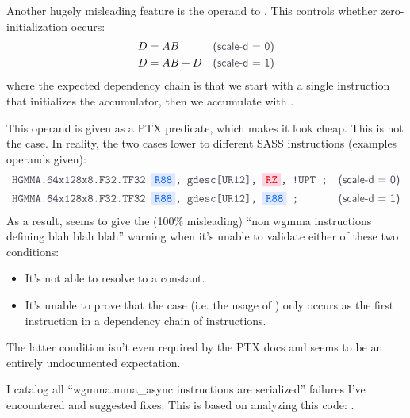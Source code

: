 \filbreak
{}

Another hugely misleading feature is the  operand to .
This controls whether zero-initialization occurs:
\begin{align*}
  & D = AB & \lightsf{(scale-d = 0)} \\
  & D = AB + D & \lightsf{(scale-d = 1)}
\end{align*}
where the expected dependency chain is that we start with a single   instruction that initializes the accumulator, then we accumulate with .

\filbreak
This  operand is given as a PTX predicate, which makes it look cheap.
This is not the case.
In reality, the two cases lower to different SASS instructions (examples operands given):
\begin{align*}
  & \lighttt{HGMMA.64x128x8.F32.TF32 \blueBox{R88}, gdesc[UR12], \redBox{RZ}, !UPT ;} & \lightsf{(scale-d = 0)} \\
  & \lighttt{HGMMA.64x128x8.F32.TF32 \blueBox{R88}, gdesc[UR12], \blueBox{R88} ;} & \lightsf{(scale-d = 1)}
\end{align*}
As a result,  seems to give the (100\% misleading) ``non wgmma instructions defining blah blah blah'' warning when it's unable to validate either of these two conditions:
\begin{itemize}
  \item It's not able to resolve  to a constant.
  \item It's unable to prove that the  case (i.e. the usage of ) only occurs as the first instruction in a dependency chain of  instructions.
\end{itemize}
The latter condition isn't even required by the PTX docs and seems to be an entirely undocumented expectation.

\filbreak
{}

I catalog all ``wgmma.mma\_async instructions are serialized'' failures I've encountered and suggested fixes.
This is based on analyzing this code: .

